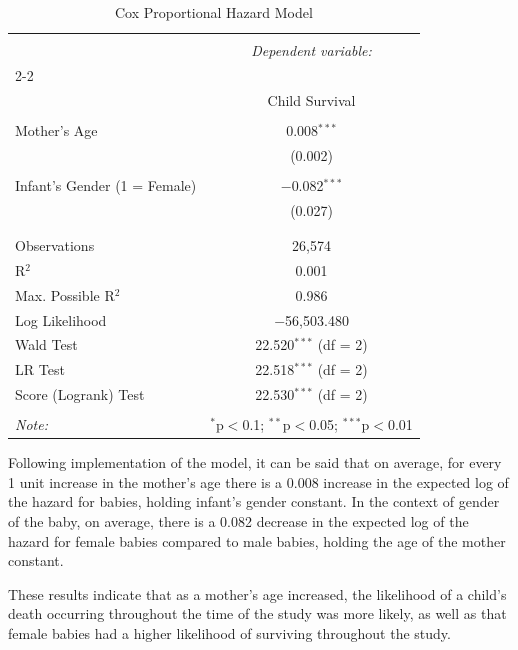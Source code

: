 \documentclass[12pt,letterpaper]{article}
\begin{document}
	\begin{table}[!htbp] \centering 
		\caption{Cox Proportional Hazard Model} 
		\label{} 
		\begin{tabular}{@{\extracolsep{5pt}}lc} 
			\\[-1.8ex]\hline 
			\hline \\[-1.8ex] 
			& \multicolumn{1}{c}{\textit{Dependent variable:}} \\ 
			\cline{2-2} 
			\\[-1.8ex] & Child Survival \\ 
			\hline \\[-1.8ex] 
			Mother's Age & 0.008$^{***}$ \\ 
			& (0.002) \\ 
			& \\ 
			Infant's Gender (1 = Female) & $-$0.082$^{***}$ \\ 
			& (0.027) \\ 
			& \\ 
			\hline \\[-1.8ex] 
			Observations & 26,574 \\ 
			R$^{2}$ & 0.001 \\ 
			Max. Possible R$^{2}$ & 0.986 \\ 
			Log Likelihood & $-$56,503.480 \\ 
			Wald Test & 22.520$^{***}$ (df = 2) \\ 
			LR Test & 22.518$^{***}$ (df = 2) \\ 
			Score (Logrank) Test & 22.530$^{***}$ (df = 2) \\ 
			\hline 
			\hline \\[-1.8ex] 
			\textit{Note:}  & \multicolumn{1}{r}{$^{*}$p$<$0.1; $^{**}$p$<$0.05; $^{***}$p$<$0.01} \\ 
		\end{tabular} 
	\end{table} 
	
	Following implementation of the model, it can be said that on average, for every 1 unit increase in the mother's age there is a 0.008 increase in the expected log of the hazard for babies, holding infant's gender constant. In the context of gender of the baby, on average, there is a 0.082 decrease in the expected log of the hazard for female babies compared to male babies, holding the age of the mother constant. 
	
	These results indicate that as a mother's age increased, the likelihood of a child's death occurring throughout the time of the study was more likely, as well as that female babies had a higher likelihood of surviving throughout the study. 
\end{document}
